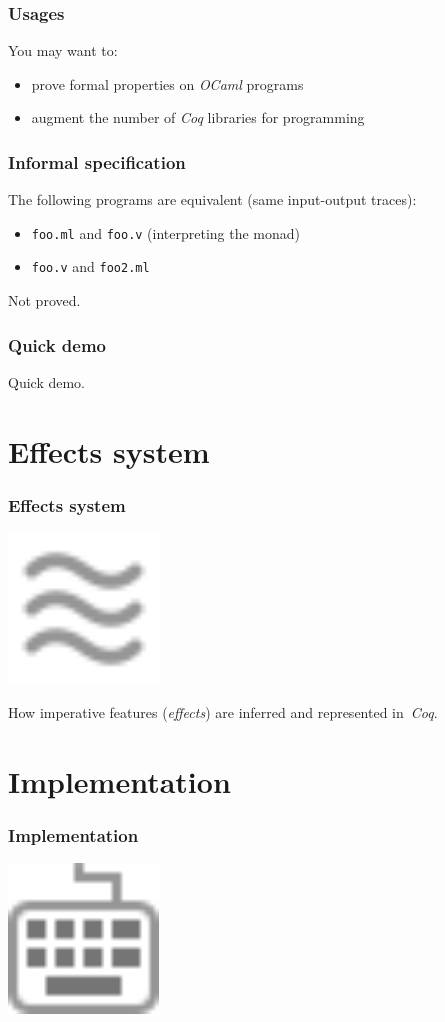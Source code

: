 \documentclass[hyperref={pdfpagelabels=false}]{beamer}
\begin{document}
  \begin{frame}
    \frametitle{Usages}
    You may want to:
    \begin{itemize}
      \item prove formal properties on \emph{OCaml} programs
      \item augment the number of \emph{Coq} libraries for programming
    \end{itemize}
  \end{frame}
  \begin{frame}
    \frametitle{Informal specification}
    The following programs are equivalent (same input-output traces):
    \begin{itemize}
      \item \texttt{foo.ml} and \texttt{foo.v} (interpreting the monad)
      \item \texttt{foo.v} and \texttt{foo2.ml}
    \end{itemize}
    Not proved.
  \end{frame}
  \begin{frame}
    \frametitle{Quick demo}
    {\Huge Quick demo.}
  \end{frame}

  \section{Effects system}
  \begin{frame}
    \frametitle{Effects system}
    \begin{center}
      \includegraphics[width=4cm]{images/effects}
    \end{center}
    \begin{center}
      How imperative features (\emph{effects}) are inferred and represented in~\emph{Coq}.
    \end{center}
  \end{frame}

  \section{Implementation}
  \begin{frame}
    \frametitle{Implementation}
    \begin{center}
      \includegraphics[width=4cm]{images/implementation}
    \end{center}
  \end{frame}
\end{document}
